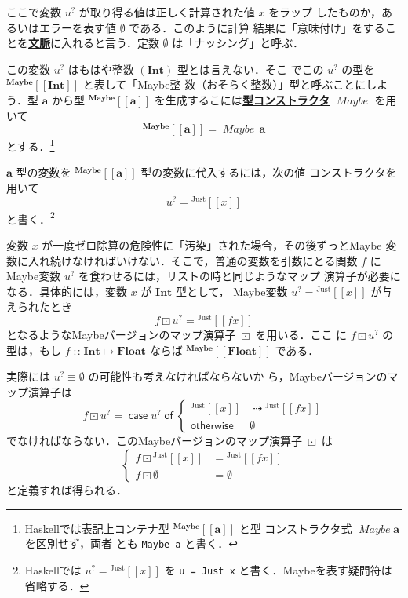 \documentclass[a5paper,twoside,fleqn,draft]{jsbook}
\def\[{\left[\!\left[}
\def\]{\right]\!\right]}
\newcommand{\programminglanguage}[1]{\textsf{#1}}
\newcommand{\haskell}{\programminglanguage{Haskell}}
\newcommand{\keyword}[1]{{\underline{\textbf{#1}}}}
\newcommand{\code}[1]{\texttt{#1}}
\newcommand{\mKeyword}[1]{\mathsf{#1}} %
\newcommand{\mCaseKeyword}{\mKeyword{case}}
\newcommand{\mOfKeyword}{\mKeyword{of}}
\newcommand{\mOtherwiseKeyword}{\mKeyword{otherwise}}
\DeclareMathOperator{\mCaseKW}{\mCaseKeyword} %
\DeclareMathOperator{\mOfKW}{\mOfKeyword} %
\DeclareMathOperator{\mOtherwise}{\mOtherwiseKeyword}
\newcommand{\mNothing}{\emptyset}
\DeclareMathOperator{\mIfSo}{\dashrightarrow}
\DeclareMathOperator{\mIn}{{:\!:}}
\DeclareMathOperator{\mMapMaybe}{\boxdot}
\DeclareMathOperator{\mMapsTo}{\mapsto}
\newcommand{\mType}[1]{\mathbf{#1}}
\newcommand{\mFloatType}{\mType{Float}}
\newcommand{\mIntType}{\mType{Int}}
\newcommand{\mGenericTypeAssemble}[2]{{}^{\mType{#1}}\[\mType{#2}\]}
\newcommand{\mMaybeType}[1]{\mGenericTypeAssemble{Maybe}{#1}}
\newcommand{\mTypeConstructor}[1]{\textit{#1}}
\DeclareMathOperator{\mMaybeTypeConstructor}{\mTypeConstructor{Maybe}}
\newcommand{\mValueConstructor}[1]{\mathrm{#1}}
\newcommand{\mGenericValueAssemble}[2]{{}^\mValueConstructor{#1}\[#2\]}
\newcommand{\mJustWith}[1]{\mGenericValueAssemble{Just}{#1}}
\newcommand{\mMaybe}[1]{{#1}^?}
\newcommand{\mCaseOf}[1]{\mCaseKW#1\mOfKW}
\newcommand{\mProj}[2]{#1\mMapsTo#2}
\begin{document}
ここで変数 $\mMaybe{u}$ が取り得る値は正しく計算された値 $x$ をラップ
したものか，あるいはエラーを表す値 $\mNothing$ である．このように計算
結果に「意味付け」をすることを\keyword{文脈}に入れると言う．定数
$\mNothing$ は「ナッシング」と呼ぶ．

この変数 $\mMaybe{u}$ はもはや整数 $(\mIntType)$ 型とは言えない．そこ
でこの $\mMaybe{u}$ の型を $\mMaybeType{\mIntType}$ と表して「Maybe整
  数（おそらく整数）」型と呼ぶことにしよう．型 $\mType{a}$ から型
$\mMaybeType{a}$ を生成するこには\keyword{型コンストラクタ}
$\mMaybeTypeConstructor$ を用いて
\begin{equation}
  \mMaybeType{a}=\mMaybeTypeConstructor\,\mType{a}
\end{equation}
とする．\footnote{\haskell では表記上コンテナ型 $\mMaybeType{a}$ と型
  コンストラクタ式 $\mMaybeTypeConstructor\mType{a}$ を区別せず，両者
  とも \code{Maybe a} と書く．}

$\mType{a}$ 型の変数を $\mMaybeType{a}$ 型の変数に代入するには，次の値
コンストラクタを用いて
\begin{equation}
\mMaybe{u}=\mJustWith{x}
\end{equation}
と書く．\footnote{\haskell では $\mMaybe{u}=\mJustWith{x}$ を \code{u
    = Just x} と書く．Maybeを表す疑問符は省略する．}

変数 $x$ が一度ゼロ除算の危険性に「汚染」された場合，その後ずっとMaybe
変数に入れ続けなければいけない．そこで，普通の変数を引数にとる関数 $f$
にMaybe変数 $\mMaybe{u}$ を食わせるには，リストの時と同じようなマップ
演算子が必要になる．具体的には，変数 $x$ が $\mType{Int}$ 型として，
Maybe変数 $\mMaybe{u}=\mJustWith{x}$ が与えられたとき
\begin{equation}
  f\mMapMaybe\mMaybe{u}=\mJustWith{fx}
\end{equation}
となるようなMaybeバージョンのマップ演算子 $\mMapMaybe$ を用いる．ここ
に $f\mMapMaybe\mMaybe{u}$ の型は，もし
$f\mIn\mProj{\mIntType}{\mFloatType}$ ならば
$\mMaybeType{\mFloatType}$ である．

実際には $\mMaybe{u}\equiv\mNothing$ の可能性も考えなければならないか
ら，Maybeバージョンのマップ演算子は
\begin{equation}
  f\mMapMaybe\mMaybe{u}=\mCaseOf{\mMaybe{u}}\begin{cases}
    \mJustWith{x}&\mIfSo\mJustWith{fx}\\
    \mOtherwise&\mNothing
  \end{cases}
\end{equation}
でなければならない．このMaybeバージョンのマップ演算子 $\mMapMaybe$ は
\begin{equation}
  \left\{
  \begin{aligned}
    f\mMapMaybe\mJustWith{x}&=\mJustWith{fx}\\ f\mMapMaybe\mNothing&=\mNothing
  \end{aligned}
  \right.
\end{equation}
と定義すれば得られる．
\end{document}
